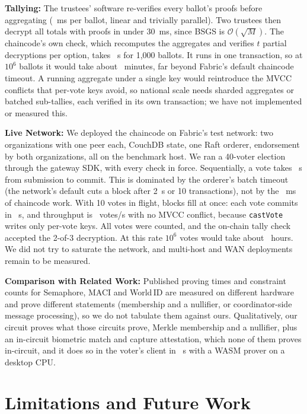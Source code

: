 \documentclass[10pt,letterpaper,journal]{IEEEtran}
\begin{document}
\textbf{Tallying:} The trustees' software re-verifies every ballot's proofs before aggregating (\nTallyVerifyMs~ms per ballot, linear and trivially parallel). Two trustees then decrypt all totals with proofs in under 30~ms, since BSGS is $\mathcal{O}(\sqrt{M})$. The chaincode's own check, which recomputes the aggregates and verifies $t$ partial decryptions per option, takes \nTallyPublishS~s for 1,000 ballots. It runs in one transaction, so at $10^6$ ballots it would take about \nTallyMillionMin~minutes, far beyond Fabric's default chaincode timeout. A running aggregate under a single key would reintroduce the MVCC conflicts that per-vote keys avoid, so national scale needs sharded aggregates or batched sub-tallies, each verified in its own transaction; we have not implemented or measured this.

\textbf{Live Network:} We deployed the chaincode on Fabric's test network: two organizations with one peer each, CouchDB state, one Raft orderer, endorsement by both organizations, all on the benchmark host. We ran a 40-voter election through the gateway SDK, with every check in force. Sequentially, a vote takes \nFabSeqS~s from submission to commit. This is dominated by the orderer's batch timeout (the network's default cuts a block after 2~s or 10 transactions), not by the \nCastVoteMs~ms of chaincode work. With 10 votes in flight, blocks fill at once: each vote commits in \nFabConcS~s, and throughput is \nFabTps~votes/s with no MVCC conflict, because \texttt{castVote} writes only per-vote keys. All \nFabVoters{} votes were counted, and the on-chain tally check accepted the 2-of-3 decryption. At this rate $10^6$ votes would take about \nFabMillionH~hours. We did not try to saturate the network, and multi-host and WAN deployments remain to be measured.

\textbf{Comparison with Related Work:} Published proving times and constraint counts for Semaphore, MACI and World\,ID are measured on different hardware and prove different statements (membership and a nullifier, or coordinator-side message processing), so we do not tabulate them against ours. Qualitatively, our circuit proves what those circuits prove, Merkle membership and a nullifier, plus an in-circuit biometric match and capture attestation, which none of them proves in-circuit, and it does so in the voter's client in \nClientS~s with a WASM prover on a desktop CPU.


\section{Limitations and Future Work}
\label{sec:limitations}
\end{document}
